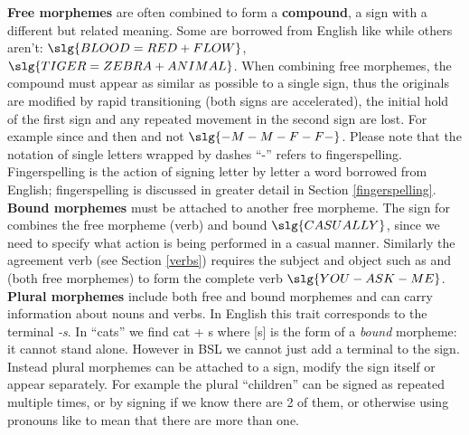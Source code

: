 \documentclass[12pt]{ociamthesis}  %
\begin{document}
\noindent 
\textbf{Free morphemes} are often combined to form a \textbf{compound}, a sign with a different but related meaning. Some are borrowed from English like  while others aren't: $\slg{BLOOD = RED + FLOW}$, $\slg{TIGER = ZEBRA + ANIMAL}$. When combining free morphemes, the compound must appear as similar as possible to a single sign, thus the originals are modified by rapid transitioning (both signs are accelerated), the initial hold of the first sign and any repeated movement in the second sign are lost. For example since  and  then  and not $\slg{-M-M-F-F-}$. Please note that the notation of single letters wrapped by dashes ``-'' refers to fingerspelling. Fingerspelling is the action of signing letter by letter a word borrowed from English; fingerspelling is discussed in greater detail in Section \ref{fingerspelling}. \\

\noindent 
\textbf{Bound morphemes} must be attached to another free morpheme. The sign for  combines the free morpheme  (verb) and bound $\slg{CASUALLY}$, since we need to specify what action is being performed in a casual manner. Similarly the agreement verb  (see Section \ref{verbs}) requires the subject and object such as  and  (both free morphemes) to form the complete verb $\slg{YOU-ASK-ME}$.\\

\noindent 
\textbf{Plural morphemes} include both free and bound morphemes and can carry information about nouns and verbs. In English this trait corresponds to the terminal \textit{-s}. In ``cats'' we find cat + s where [s] is the form of a \textit{bound} morpheme: it cannot stand alone. However in BSL we cannot just add a terminal to the sign. Instead plural morphemes can be attached to a sign, modify the sign itself or appear separately. For example the plural ``children'' can be signed as  repeated multiple times, or by signing  if we know there are 2 of them, or otherwise using pronouns like  to mean that there are more than one.\\
\end{document}
